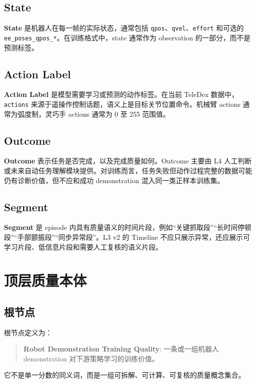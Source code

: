 \documentclass[UTF8,zihao=-4]{ctexart}
\newcommand{\Code}[1]{\texttt{#1}}
\newcommand{\Term}[1]{\textbf{#1}}
\begin{document}
\subsection{State}

\Term{State} 是机器人在每一帧的实际状态，通常包括 \Code{qpos}、\Code{qvel}、\Code{effort} 和可选的 \Code{ee\_poses\_qpos\_*}。在训练格式中，state 通常作为 observation 的一部分，而不是预测标签。

\subsection{Action Label}

\Term{Action Label} 是模型需要学习或预测的动作标签。在当前 TeleDex 数据中，\Code{actions} 来源于遥操作控制话题，语义上是目标关节位置命令。机械臂 actions 通常为弧度制，灵巧手 actions 通常为 0 至 255 范围值。

\subsection{Outcome}

\Term{Outcome} 表示任务是否完成，以及完成质量如何。Outcome 主要由 L4 人工判断或未来自动任务理解模块提供。对训练而言，任务失败但动作过程完整的数据可能仍有诊断价值，但不应和成功 demonstration 混入同一类正样本训练集。

\subsection{Segment}

\Term{Segment} 是 episode 内具有质量语义的时间片段，例如“关键抓取段”“长时间停顿段”“手部颤振段”“同步异常段”。L3 v2 的 Timeline 不应只展示异常，还应展示可学习片段、低信息片段和需要人工复核的语义片段。

\section{顶层质量本体}

\subsection{根节点}

根节点定义为：
\begin{quote}
\Term{Robot Demonstration Training Quality}: 一条或一组机器人 demonstration 对下游策略学习的训练价值。
\end{quote}

它不是单一分数的同义词，而是一组可拆解、可计算、可复核的质量概念集合。
\end{document}
